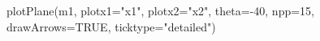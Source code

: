 \begin{Schunk}
\begin{Sinput}
 plotPlane(m1, plotx1="x1", plotx2="x2", theta=-40, npp=15, drawArrows=TRUE, ticktype="detailed")
\end{Sinput}
\end{Schunk}
